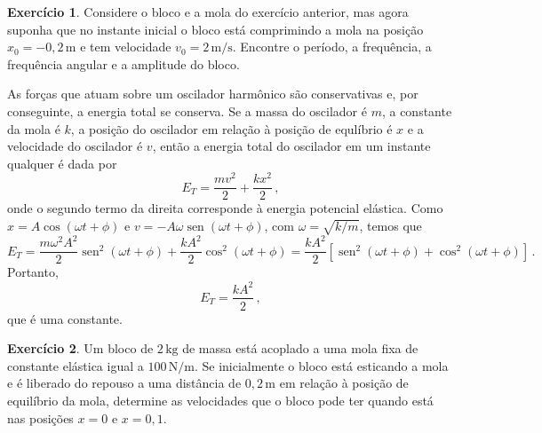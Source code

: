 \documentclass[12pt,a4paper]{article}
\theoremstyle{definition}
\newtheorem{ex}{Exercício}[section]
\DeclareMathOperator{\sen}{sen}
\begin{document}
\begin{ex}
  Considere o bloco e a mola do exercício anterior, mas agora suponha
  que no instante inicial o bloco está comprimindo a mola na posição
  $x_0=-0{,}2\,\mathrm{m}$ e tem velocidade
  $v_0=2\,\mathrm{m/s}$. Encontre o período, a frequência, a
  frequência angular e a amplitude do bloco.
\end{ex}

As forças que atuam sobre um oscilador harmônico são conservativas e,
por conseguinte, a energia total se conserva. Se a massa do oscilador
é $m$, a constante da mola é $k$, a posição do oscilador em relação à
posição de equlíbrio é $x$ e a velocidade do oscilador é $v$, então a
energia total do oscilador em um instante qualquer é dada por
$$E_T=\frac{mv^2}{2}+\frac{kx^2}{2}\,,$$
onde o segundo termo da direita corresponde à energia potencial
elástica. Como $x=A\cos(\omega t+\phi)$ e
$v=-A\omega\sen(\omega t+\phi)$, com $\omega=\sqrt{k/m}$, temos que
$$E_T=\frac{m\omega^2A^2}{2}\sen^2(\omega t+\phi)+\frac{kA^2}{2}\cos^2(\omega t+\phi)=\frac{kA^2}{2}[\sen^2(\omega t+\phi)+\cos^2(\omega t+\phi)]\,.$$
Portanto,
\begin{equation}
  E_T=\frac{kA^2}{2}\,,
\end{equation}
que é uma constante.

\begin{ex}
  Um bloco de $2\,\mathrm{kg}$ de massa está acoplado a uma mola fixa
  de constante elástica igual a $100\,\mathrm{N/m}$. Se inicialmente o
  bloco está esticando a mola e é liberado do repouso a uma distância
  de $0{,}2\,\mathrm{m}$ em relação à posição de equilíbrio da mola,
  determine as velocidades que o bloco pode ter quando está nas
  posições $x=0$ e $x=0{,}1$.
\end{ex}
\end{document}
